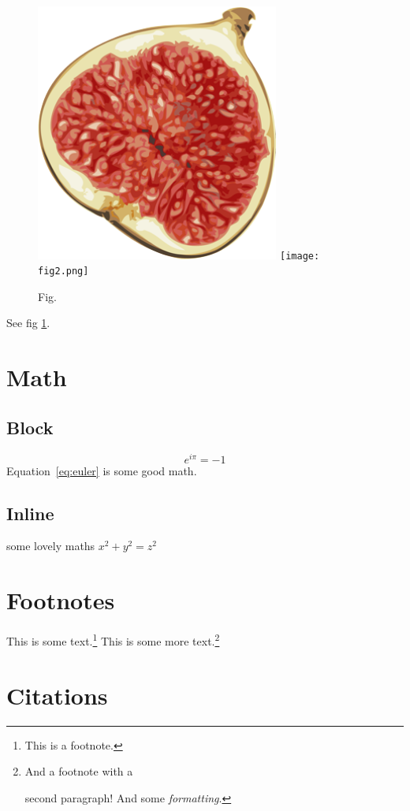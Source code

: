 \documentclass{article}
\begin{document}
  \begin{figure}[h]
    \includegraphics[width=8cm]{fig.png}
    \texttt{[image: fig2.png]}
    \caption{Fig.}
    \label{fig:fig}
  \end{figure}
  See fig \ref{fig:fig}.

  \section{Math}

  \subsection{Block}

  \begin{equation}
    e^{i\pi}=-1
    \label{eq:euler}
  \end{equation}
  Equation~\ref{eq:euler} is some good math.

  \subsection{Inline}

  some lovely maths \(x^2 + y^2 = z^2\)

  \section{Footnotes}

  This is some text.\footnote{This is a footnote.} This is some more text.\footnote{And a footnote with a

  second paragraph! And some \emph{formatting}.}

  \section{Citations}
\end{document}
